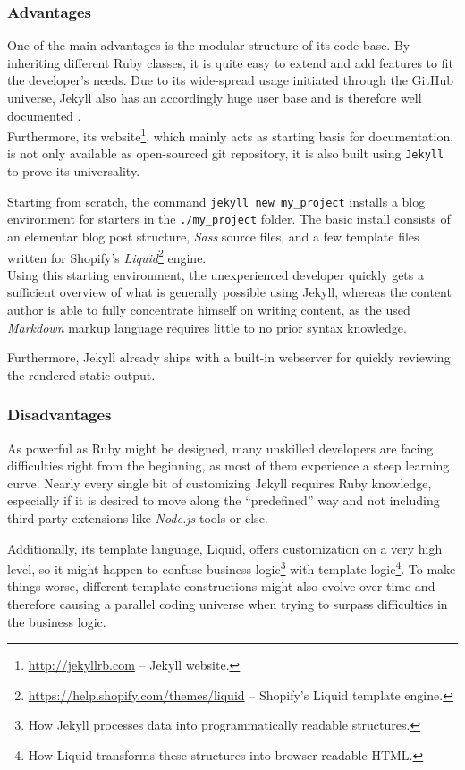 \subsubsection{Advantages}
One of the main advantages is the modular structure of its code base. By inheriting different Ruby classes, it is quite easy to extend and add features to fit the developer's needs. Due to its wide-spread usage initiated through the GitHub universe, Jekyll also has an accordingly huge user base and is therefore well documented \cite[26]{dhillon2016}.\\ Furthermore, its website\footnote{\url{http://jekyllrb.com} -- Jekyll website.}, which mainly acts as starting basis for documentation, is not only available as open-sourced git repository, it is also built using \texttt{Jekyll} to prove its universality.

Starting from scratch, the command \texttt{jekyll new my\_project} installs a blog environment for starters in the \texttt{./my\_project} folder. The basic install consists of an elementar blog post structure, \emph{Sass} source files, and a few template files written for Shopify's \emph{Liquid}\footnote{\url{https://help.shopify.com/themes/liquid} -- Shopify's Liquid template engine.} engine.\\
Using this starting environment, the unexperienced developer quickly gets a sufficient overview of what is generally possible using Jekyll, whereas the content author is able to fully concentrate himself on writing content, as the used \emph{Markdown} markup language requires little to no prior syntax knowledge.

Furthermore, Jekyll already ships with a built-in webserver for quickly reviewing the rendered static output.

\subsubsection{Disadvantages}
As powerful as Ruby might be designed, many unskilled developers are facing difficulties right from the beginning, as most of them experience a steep learning curve. Nearly every single bit of customizing Jekyll requires Ruby knowledge, especially if it is desired to move along the ``predefined'' way and not including third-party extensions like \emph{Node.js} tools or else.

Additionally, its template language, Liquid, offers customization on a very high level, so it might happen to confuse business logic\footnote{How Jekyll processes data into programmatically readable structures.} with template logic\footnote{How Liquid transforms these structures into browser-readable HTML.}. To make things worse, different template constructions might also evolve over time and therefore causing a parallel coding universe when trying to surpass difficulties in the business logic.

